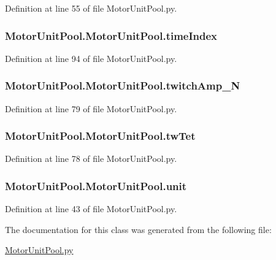 Definition at line 55 of file Motor\-Unit\-Pool.\-py.

\hypertarget{class_motor_unit_pool_1_1_motor_unit_pool_ab5659e1c9355ecf529d9b8be8cbf6d65}{
\subsubsection[{time\-Index}]{\setlength{\rightskip}{0pt plus 5cm}Motor\-Unit\-Pool.\-Motor\-Unit\-Pool.\-time\-Index}}\label{class_motor_unit_pool_1_1_motor_unit_pool_ab5659e1c9355ecf529d9b8be8cbf6d65}


Definition at line 94 of file Motor\-Unit\-Pool.\-py.

\hypertarget{class_motor_unit_pool_1_1_motor_unit_pool_a03538b06e7220f9d48c7306ed6508c05}{
\subsubsection[{twitch\-Amp\-\_\-\-N}]{\setlength{\rightskip}{0pt plus 5cm}Motor\-Unit\-Pool.\-Motor\-Unit\-Pool.\-twitch\-Amp\-\_\-\-N}}\label{class_motor_unit_pool_1_1_motor_unit_pool_a03538b06e7220f9d48c7306ed6508c05}


Definition at line 79 of file Motor\-Unit\-Pool.\-py.

\hypertarget{class_motor_unit_pool_1_1_motor_unit_pool_a785a769c5b4824603a24339e4f0d8dfe}{
\subsubsection[{tw\-Tet}]{\setlength{\rightskip}{0pt plus 5cm}Motor\-Unit\-Pool.\-Motor\-Unit\-Pool.\-tw\-Tet}}\label{class_motor_unit_pool_1_1_motor_unit_pool_a785a769c5b4824603a24339e4f0d8dfe}


Definition at line 78 of file Motor\-Unit\-Pool.\-py.

\hypertarget{class_motor_unit_pool_1_1_motor_unit_pool_a1b14c831606c27efae62f1468850393b}{
\subsubsection[{unit}]{\setlength{\rightskip}{0pt plus 5cm}Motor\-Unit\-Pool.\-Motor\-Unit\-Pool.\-unit}}\label{class_motor_unit_pool_1_1_motor_unit_pool_a1b14c831606c27efae62f1468850393b}


Definition at line 43 of file Motor\-Unit\-Pool.\-py.



The documentation for this class was generated from the following file\-:\begin{DoxyCompactItemize}
\item 
\hyperlink{_motor_unit_pool_8py}{Motor\-Unit\-Pool.\-py}\end{DoxyCompactItemize}
